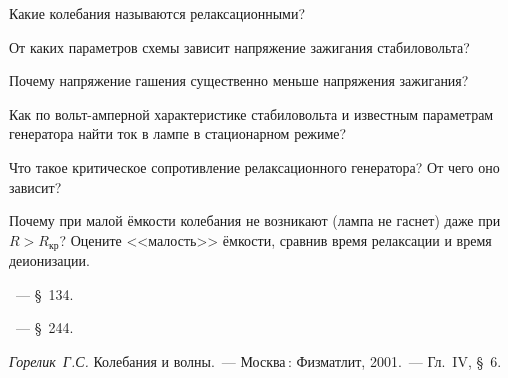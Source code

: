 \begin{lab:questions}
	\item Какие колебания называются релаксационными?

	\item От каких параметров схемы зависит напряжение зажигания стабиловольта?

	\item Почему напряжение гашения существенно меньше напряжения зажигания?


	\item Как по вольт-амперной характеристике стабиловольта и известным
параметрам генератора найти ток в лампе в стационарном режиме?

	\item Что такое критическое сопротивление релаксационного генератора? От
чего оно зависит?


	\item *Почему при малой ёмкости колебания не возникают (лампа не гаснет) даже
при $R>R_{\text{кр}}$? Оцените <<малость>> ёмкости,
сравнив время релаксации и время деионизации.

\end{lab:questions}

\pagebreak

\begin{lab:literature}

	\item \SivuhinIII~--- \S~134.

	\item \Kalashnikov~--- \S~244.

	\item \emph{Горелик~Г.С.} Колебания и волны.~--- Москва\,: Физматлит, 2001.~---
Гл.~IV, \S~6.
\end{lab:literature}
